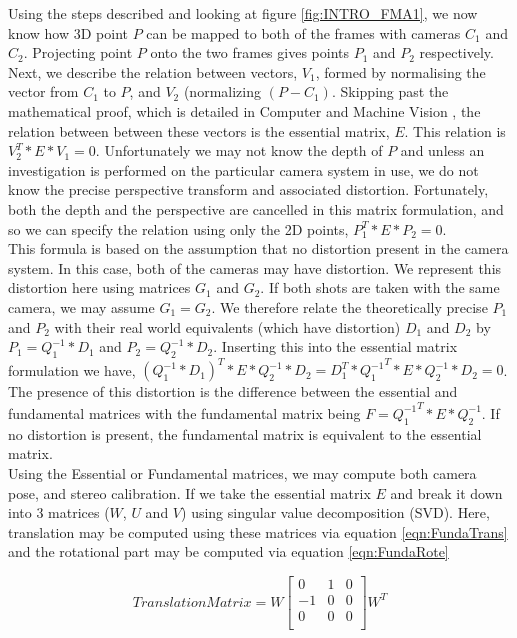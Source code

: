 Using the steps described and looking at figure \ref{fig:INTRO_FMA1}, we now know how 3D point $P$ can be mapped to both of the frames with cameras $C_1$ and $C_2$. Projecting point $P$ onto the two frames gives points $P_1$ and $P_2$ respectively. Next, we describe the relation between vectors, $V_1$, formed by normalising the vector from $C_1$ to $P$, and $V_2$ (normalizing $(P - C_1)$. Skipping past the mathematical proof, which is detailed in Computer and Machine Vision \cite{Davies12Computer}, the relation between between these vectors is the essential matrix, $E$. This relation is $V_2^{T} * E * V_1 = 0$. Unfortunately we may not know the depth of $P$ and unless an investigation is performed on the particular camera system in use, we do not know the precise perspective transform and associated distortion. Fortunately, both the depth and the perspective are cancelled in this matrix formulation, and so we can specify the relation using only the 2D points, $P_1^T * E * P_2 = 0$. \\

This formula is based on the assumption that no distortion present in the camera system. In this case, both of the cameras may have distortion. We represent this distortion here using matrices $G_1$ and $G_2$. If both shots are taken with the same camera, we may assume $G_1 = G_2$. We therefore relate the theoretically precise $P_1$ and $P_2$ with their real world equivalents (which have distortion) $D_1$ and $D_2$ by $P_1 = Q_1^{-1} * D_1$ and $P_2 = Q_2^{-1} * D_2$. Inserting this into the essential matrix formulation we have, $(Q_1^{-1} * D_1)^T * E * Q_2^{-1} * D_2 = D_{1}^{T} * {Q_1^{-1}}^{T} * E * Q_2^{-1} * D_2 = 0$. The presence of this distortion is the difference between the essential and fundamental matrices with the fundamental matrix being $F = {Q_1^{-1}}^{T} * E * Q_2^{-1}$. If no distortion is present, the fundamental matrix is equivalent to the essential matrix. \\

Using the Essential or Fundamental matrices, we may compute both camera pose, and stereo calibration. If we take the essential matrix $E$ and break it down into 3 matrices ($W$, $U$ and $V$) using singular value decomposition (SVD). Here, translation may be computed using these matrices via equation \ref{eqn:FundaTrans} and the rotational part may be computed via equation \ref{eqn:FundaRote}


\begin{equation} \label{eqn:FundaTrans}
Translation Matrix = W\left[
\begin{array}{ccc}
0 & 1 & 0 \\
-1 & 0 & 0 \\
0 & 0 & 0 \\
\end{array}
\right]W^{T}
\end{equation}

